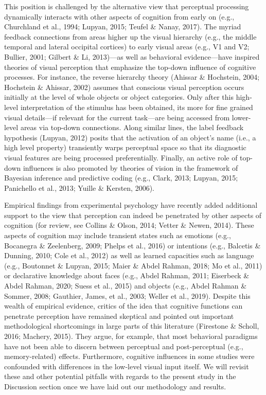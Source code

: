 \documentclass[
  english,
  doc,12pt,twoside,floatsintext]{apa7}
\begin{document}
This position is challenged by the alternative view that perceptual processing dynamically interacts with other aspects of cognition from early on (e.g., Churchland et al., 1994; Lupyan, 2015; Teufel \& Nanay, 2017). The myriad feedback connections from areas higher up the visual hierarchy (e.g., the middle temporal and lateral occipital cortices) to early visual areas (e.g., V1 and V2; Bullier, 2001; Gilbert \& Li, 2013)---as well as behavioral evidence---have inspired theories of visual perception that emphasize the top-down influence of cognitive processes. For instance, the reverse hierarchy theory (Ahissar \& Hochstein, 2004; Hochstein \& Ahissar, 2002) assumes that conscious visual perception occurs initially at the level of whole objects or object categories. Only after this high-level interpretation of the stimulus has been obtained, its more for fine grained visual details---if relevant for the current task---are being accessed from lower-level areas via top-down connections. Along similar lines, the label feedback hypothesis (Lupyan, 2012) posits that the activation of an object's name (i.e., a high level property) transiently warps perceptual space so that its diagnostic visual features are being processed preferentially. Finally, an active role of top-down influences is also promoted by theories of vision in the framework of Bayesian inference and predictive coding (e.g., Clark, 2013; Lupyan, 2015; Panichello et al., 2013; Yuille \& Kersten, 2006).

Empirical findings from experimental psychology have recently added additional support to the view that perception can indeed be penetrated by other aspects of cognition (for review, see Collins \& Olson, 2014; Vetter \& Newen, 2014). These aspects of cognition may include transient states such as emotions (e.g., Bocanegra \& Zeelenberg, 2009; Phelps et al., 2016) or intentions (e.g., Balcetis \& Dunning, 2010; Cole et al., 2012) as well as learned capacities such as language (e.g., Boutonnet \& Lupyan, 2015; Maier \& Abdel Rahman, 2018; Mo et al., 2011) or declarative knowledge about faces (e.g., Abdel Rahman, 2011; Eiserbeck \& Abdel Rahman, 2020; Suess et al., 2015) and objects (e.g., Abdel Rahman \& Sommer, 2008; Gauthier, James, et al., 2003; Weller et al., 2019). Despite this wealth of empirical evidence, critics of the idea that cognitive functions can penetrate perception have remained skeptical and pointed out important methodological shortcomings in large parts of this literature (Firestone \& Scholl, 2016; Machery, 2015). They argue, for example, that most behavioral paradigms have not been able to discern between perceptual and post-perceptual (e.g., memory-related) effects. Furthermore, cognitive influences in some studies were confounded with differences in the low-level visual input itself. We will revisit these and other potential pitfalls with regards to the present study in the Discussion section once we have laid out our methodology and results.
\end{document}
